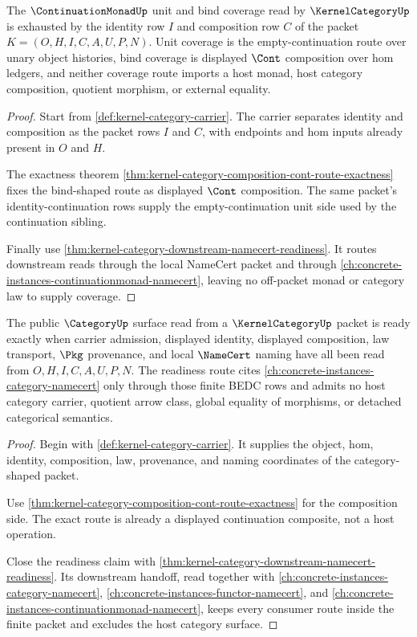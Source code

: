 \begin{theorem}
\label{thm:kernel-category-continuationmonad-route-coverage}
The $\ContinuationMonadUp$ unit and bind coverage read by $\KernelCategoryUp$ is exhausted by the identity row $I$ and composition row $C$ of the packet $K=(O,H,I,C,A,U,P,N)$. Unit coverage is the empty-continuation route over unary object histories, bind coverage is displayed $\Cont$ composition over hom ledgers, and neither coverage route imports a host monad, host category composition, quotient morphism, or external equality.
\end{theorem}
\begin{proof}
Start from \autoref{def:kernel-category-carrier}. The carrier separates identity and composition as the packet rows $I$ and $C$, with endpoints and hom inputs already present in $O$ and $H$.

The exactness theorem \autoref{thm:kernel-category-composition-cont-route-exactness} fixes the bind-shaped route as displayed $\Cont$ composition. The same packet's identity-continuation rows supply the empty-continuation unit side used by the continuation sibling.

Finally use \autoref{thm:kernel-category-downstream-namecert-readiness}. It routes downstream reads through the local NameCert packet and through \autoref{ch:concrete-instances-continuationmonad-namecert}, leaving no off-packet monad or category law to supply coverage.
\end{proof}

\begin{theorem}
\label{thm:kernel-category-category-surface-readiness}
The public $\CategoryUp$ surface read from a $\KernelCategoryUp$ packet is ready exactly when carrier admission, displayed identity, displayed composition, law transport, $\Pkg$ provenance, and local $\NameCert$ naming have all been read from $O,H,I,C,A,U,P,N$. The readiness route cites \autoref{ch:concrete-instances-category-namecert} only through those finite BEDC rows and admits no host category carrier, quotient arrow class, global equality of morphisms, or detached categorical semantics.
\end{theorem}
\begin{proof}
Begin with \autoref{def:kernel-category-carrier}. It supplies the object, hom, identity, composition, law, provenance, and naming coordinates of the category-shaped packet.

Use \autoref{thm:kernel-category-composition-cont-route-exactness} for the composition side. The exact route is already a displayed continuation composite, not a host operation.

Close the readiness claim with \autoref{thm:kernel-category-downstream-namecert-readiness}. Its downstream handoff, read together with \autoref{ch:concrete-instances-category-namecert}, \autoref{ch:concrete-instances-functor-namecert}, and \autoref{ch:concrete-instances-continuationmonad-namecert}, keeps every consumer route inside the finite packet and excludes the host category surface.
\end{proof}

